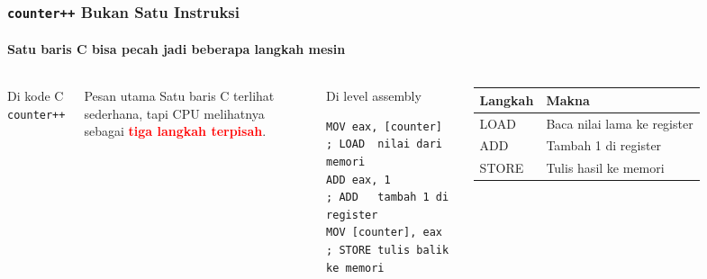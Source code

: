 \documentclass[t,aspectratio=169,xcolor=dvipsnames]{beamer}
\newcommand{\tem}[1]{\textbf{\textcolor{red}{#1}}}
\begin{document}
\begin{frame}[fragile]
    \frametitle{\texttt{counter++} Bukan Satu Instruksi}
    \framesubtitle{Satu baris C bisa pecah jadi beberapa langkah mesin}
    \scriptsize

    \begin{columns}[T]
        \begin{block}{Di kode C}
            \centering
            \Huge\texttt{counter++}
        \end{block}

        \vspace{0.2cm}
        \begin{exampleblock}{Pesan utama}
            \small Satu baris C terlihat sederhana, tapi CPU melihatnya sebagai \tem{tiga langkah terpisah}.
        \end{exampleblock}

        \begin{block}{Di level assembly}
\begin{lstlisting}[basicstyle=\ttfamily\scriptsize]
MOV eax, [counter]   ; LOAD  nilai dari memori
ADD eax, 1           ; ADD   tambah 1 di register
MOV [counter], eax   ; STORE tulis balik ke memori
\end{lstlisting}
        \end{block}

        \vspace{0.1cm}
        \scriptsize
        \begin{tabular}{p{}p{}}
            \toprule
            \textbf{Langkah} & \textbf{Makna} \\
            \midrule
            LOAD & Baca nilai lama ke register \\
            ADD & Tambah 1 di register \\
            STORE & Tulis hasil ke memori \\
            \bottomrule
        \end{tabular}
    \end{columns}
\end{frame}
\end{document}
